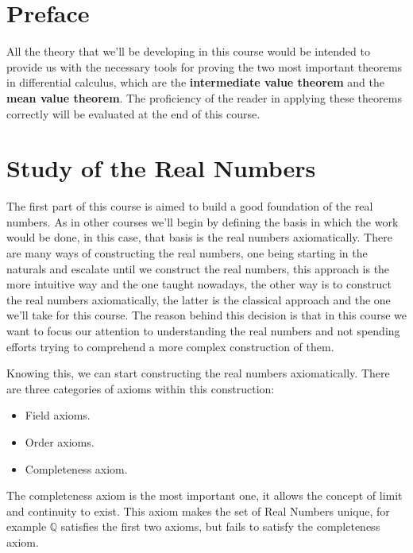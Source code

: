 \documentclass{report}
\begin{document}

    \chapter*{Preface}

    All the theory that we'll be developing in this course would be intended to provide us with the necessary tools for proving the two most important theorems in differential calculus, which are the \textbf{intermediate value theorem} and the \textbf{mean value theorem}. The proficiency of the reader in applying these theorems correctly will be evaluated at the end of this course.

    \tableofcontents

    \pagebreak
    \chapter{ Study of the Real Numbers }

    The first part of this course is aimed to build a good foundation of the real numbers. As in other courses we'll begin by defining the basis in which the work would be done, in this case, that basis is the real numbers axiomatically. There are many ways of constructing the real numbers, one being starting in the naturals and escalate until we construct the real numbers, this approach is the more intuitive way and the one taught nowadays, the other way is to construct the real numbers axiomatically, the latter is the classical approach and the one we'll take for this course. The reason behind this decision is that in this course we want to focus our attention to understanding the real numbers and not spending efforts trying to comprehend a more complex construction of them.

    Knowing this, we can start constructing the real numbers axiomatically. There are three categories of axioms within this construction:

    \begin{itemize}
        \item Field axioms.
        \item Order axioms.
        \item Completeness axiom.
    \end{itemize}

    \begin{noteBox}
        The completeness axiom is the most important one, it allows the concept of limit and continuity to exist. This axiom makes the set of Real Numbers unique, for example $\mathbb{Q}$ satisfies the first two axioms, but fails to satisfy the completeness axiom.
    \end{noteBox}
\end{document}
